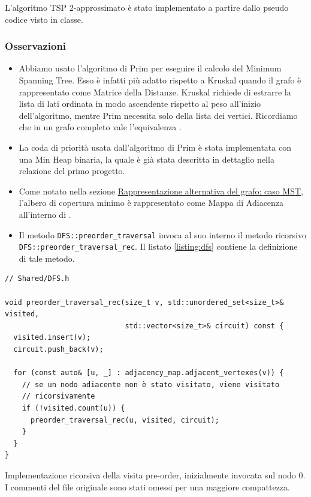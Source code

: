 \noindent L'algoritmo TSP 2-approssimato è stato implementato a partire dallo pseudo codice visto in classe. \\

\subsubsection{Osservazioni}

\begin{itemize}
    \item Abbiamo usato l'algoritmo di Prim per eseguire il calcolo del Minimum Spanning Tree. Esso è infatti più adatto rispetto a Kruskal quando il grafo è rappresentato come Matrice della Distanze. Kruskal richiede di estrarre la lista di lati ordinata in modo ascendente rispetto al peso all'inizio dell'algoritmo, mentre Prim necessita solo della lista dei vertici. Ricordiamo che in un grafo completo vale l'equivalenza \complexityCompleteGraph{}.

    \item La coda di priorità usata dall'algoritmo di Prim è stata implementata con una Min Heap binaria, la quale è già stata descritta in dettaglio nella relazione del primo progetto.

    \item Come notato nella sezione \hyperref[alternative-graph-representation]{Rappresentazione alternativa del grafo: caso MST}, l'albero di copertura minimo è rappresentato come Mappa di Adiacenza all'interno di .

    \item Il metodo \texttt{DFS::preorder_traversal} invoca al suo interno il metodo ricorsivo \\
    \texttt{DFS::preorder_traversal_rec}. Il listato \ref{listing:dfs} contiene la definizione di tale metodo.
\end{itemize}

\begin{listing}[!ht]
\begin{verbatim}
// Shared/DFS.h

void preorder_traversal_rec(size_t v, std::unordered_set<size_t>& visited,
                            std::vector<size_t>& circuit) const {
  visited.insert(v);
  circuit.push_back(v);

  for (const auto& [u, _] : adjacency_map.adjacent_vertexes(v)) {
    // se un nodo adiacente non è stato visitato, viene visitato
    // ricorsivamente
    if (!visited.count(u)) {
      preorder_traversal_rec(u, visited, circuit);
    }
  }
}
\end{verbatim}
\caption{Implementazione ricorsiva della visita pre-order, inizialmente invocata sul nodo $0$. I commenti del file originale sono stati omessi per una maggiore compattezza.}
\label{listing:dfs}
\end{listing}

